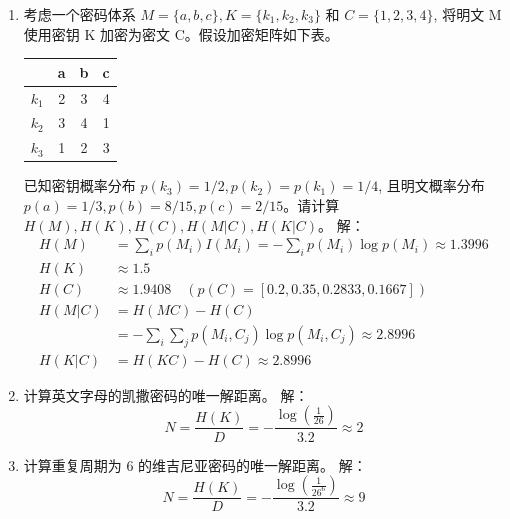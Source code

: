 \documentclass[degree=project,degree-type=project,cjk-font=noto]{thuthesis}
\begin{document}
\begin{enumerate}
  \setlength{\itemsep}{3\parskip}
  \item 考虑一个密码体系 $M = \{a, b, c\}, K = \{k_1, k_2, k_3\}$ 和 $C = \{1, 2, 3, 4\}$, 将明文 M 使用密钥 K 加密为密文 C。假设加密矩阵如下表。
  \begin{table}[htp]
  	\centering
  	\begin{tabular}{|c|c|c|c|}
  		\hline
  		& a & b & c \\\hline
  		$k_1$ & 2 & 3 & 4 \\\hline
  		$k_2$ & 3 & 4 & 1 \\\hline
  		$k_3$ & 1 & 2 & 3 \\\hline
	\end{tabular}
  \end{table}
  \newline
  已知密钥概率分布 $p(k_3) = 1/2, p(k_2) = p(k_1) = 1/4$, 且明文概率分布 $p(a) = 1/3, p(b) = 8/15, p(c)  = 2/15$。请计算 $H(M), H(K), H(C), H(M|C), H(K|C)$。
  \newline
  {\heiti 解：}
  \begin{align}
  	H(M) &= \sum_i p(M_i) I(M_i) = -\sum_i p(M_i) \log p(M_i) \approx 1.3996 \\
  	H(K) &\approx 1.5 \\
  	H(C) &\approx 1.9408 \quad (p(C) = [0.2, 0.35, 0.2833, 0.1667]) \\
  	H(M|C) &= H(MC) - H(C) \nonumber \\
          &= -\sum_i \sum_j p(M_i, C_j) \log p(M_i, C_j) \approx 2.8996 \\
  	H(K|C) &= H(KC) - H(C) \approx 2.8996
  \end{align}

\item 计算英文字母的凯撒密码的唯一解距离。
\newline
{\heiti 解：}
\newline
\begin{equation}
N = \frac{H(K)}{D} = - \frac{\log\left(\frac{1}{26}\right)}{3.2} \approx 2
\end{equation}
\newline

\item 计算重复周期为 6 的维吉尼亚密码的唯一解距离。
\newline
{\heiti 解：}
\newline
\begin{equation}
N = \frac{H(K)}{D} = - \frac{\log \left(\frac{1}{26^6}\right)}{3.2} \approx 9
\end{equation}
\newline


\end{enumerate}
\end{document}
